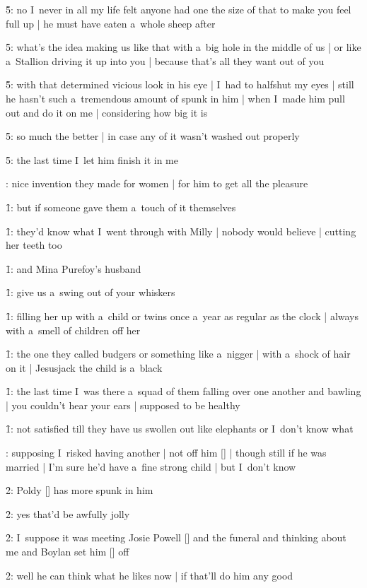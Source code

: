 \f5:
no I~never in all my life felt anyone had one the size of that to make you feel full up |
he must have eaten a~whole sheep after

\f5:
what's the idea making us like that with a~big hole in the middle of us |
or like a~Stallion driving it up into you |
because that's all they want out of you

\f5:
with that determined vicious look in his eye |
I~had to halfshut my eyes |
still he hasn't such a~tremendous amount of spunk in him |
when I~made him pull out and do it on me |
considering how big it is

\f5:
so much the better |
in case any of it wasn't washed out properly

\f5:
the last time I~let him finish it in me

:
nice invention they made for women |
for him to get all the pleasure

\f1:
but if someone gave them a~touch of it themselves

\f1:
they'd know what I~went through with Milly |
nobody would believe |
cutting her teeth too

\f1:
and Mina Purefoy's husband

\f1:
give us a~swing out of your whiskers

\f1:
filling her up with a~child or twins once a~year as regular as the clock |
always with a~smell of children off her

\f1:
the one they called budgers or something like a~nigger |
with a~shock of hair on it |
Jesusjack the child is a~black

\f1:
the last time I~was there a~squad of them falling over one another and bawling |
you couldn't hear your ears |
supposed to be healthy

\f1:
not satisfied till they have us swollen out like elephants or I~don't know what

:
supposing I~risked having another |
not off him [\boylan] |
though still if he was married |
I'm sure he'd have a~fine strong child |
but I~don't know

\f2:
Poldy [\bloom] has more spunk in him

\f2:
yes that'd be awfully jolly

\f2:
I~suppose it was meeting Josie Powell [\josie] and the funeral
and thinking about me and Boylan set him [\bloom] off

\f2:
well he can think what he likes now |
if that'll do him any good

